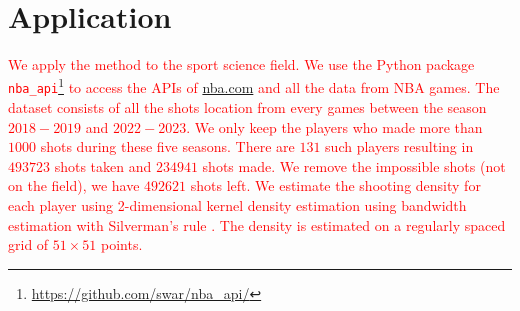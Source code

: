 \section{Application} %
\label{sec:application}

\textcolor{red}{We apply the method to the sport science field. We use the Python package \texttt{nba\_api}\footnote{\url{https://github.com/swar/nba_api/}} to access the APIs of \url{nba.com} and all the data from NBA games. The dataset consists of all the shots location from every games between the season $2018-2019$ and $2022-2023$. We only keep the players who made more than $1000$ shots during these five seasons. There are $131$ such players resulting in $493723$ shots taken and $234941$ shots made. We remove the impossible shots (not on the field), we have $492621$ shots left. We estimate the shooting density for each player using 2-dimensional kernel density estimation using bandwidth estimation with Silverman's rule \cite{silvermanDensityEstimationStatistics1986}. The density is estimated on a regularly spaced grid of $51 \times 51$ points.}

